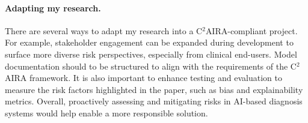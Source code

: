 \documentclass[11pt]{article}
\begin{document}
\paragraph{Adapting my research.}
There are several ways to adapt my research into a C$^2$AIRA-compliant project. 
For example, stakeholder engagement can be expanded during development to surface more diverse risk perspectives, especially from clinical end-users. 
Model documentation should to be structured to align with the requirements of the C$^2$AIRA framework.
It is also important to enhance testing and evaluation to measure the risk factors highlighted in the paper, such as bias and explainability metrics. 
Overall, proactively assessing and mitigating risks in AI-based diagnosis systems would help enable a more responsible solution.




\end{document}
